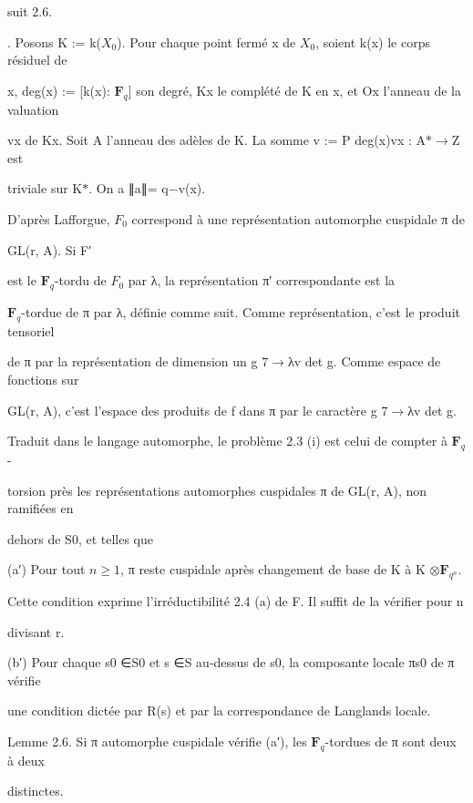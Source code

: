 \documentclass[11pt]{article}
\begin{document}
\noindent suit 2.6.\par
{}. Posons K := k(\(X_0\)). Pour chaque point fermé x de \(X_0\), soient k(x) le corps résiduel de\par
\noindent x, deg(x) := [k(x): \(\mathbf F_q\)] son degré, Kx le complété de K en x, et Ox l’anneau de la valuation\par
\noindent vx de Kx. Soit A l’anneau des adèles de K. La somme v := P deg(x)vx : A\(*\)\(\to\)Z est\par
\noindent triviale sur K\(*\). On a ∥a∥= q−v(x).\par
\noindent D’après Lafforgue, \(F_0\) correspond à une représentation automorphe cuspidale π de\par
\noindent GL(r, A). Si F′\par
{} est le \(\mathbf F_q\)-tordu de \(F_0\) par λ, la représentation π′ correspondante est la\par
\noindent \(\mathbf F_q\)-tordue de π par λ, définie comme suit. Comme représentation, c’est le produit tensoriel\par
\noindent de π par la représentation de dimension un g 7\(\to\)λv det g. Comme espace de fonctions sur\par
\noindent GL(r, A), c’est l’espace des produits de f dans π par le caractère g 7\(\to\)λv det g.\par
\noindent Traduit dans le langage automorphe, le problème 2.3 (i) est celui de compter à \(\mathbf F_q\)-\par
\noindent torsion près les représentations automorphes cuspidales π de GL(r, A), non ramifiées en\par
\noindent dehors de S0, et telles que\par
\noindent (a′) Pour tout \(n\geq 1\), π reste cuspidale après changement de base de K à K \(\otimes\)\(\mathbf F_{q^n}\).\par
\noindent Cette condition exprime l’irréductibilité 2.4 (a) de F. Il suffit de la vérifier pour n\par
\noindent divisant r.\par
\noindent (b′) Pour chaque s0 ∈S0 et s ∈S au-dessus de s0, la composante locale πs0 de π vérifie\par
\noindent une condition dictée par R(s) et par la correspondance de Langlands locale.\par
\noindent Lemme 2.6. Si π automorphe cuspidale vérifie (a′), les \(\mathbf F_q\)-tordues de π sont deux à deux\par
\noindent distinctes.\par
\end{document}
